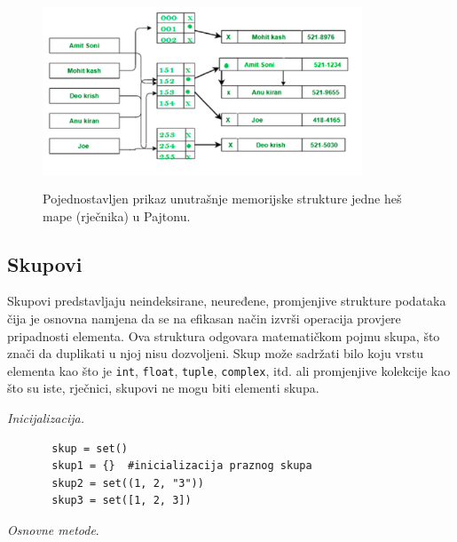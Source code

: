 	
	\begin{figure}
		\centering
		\includegraphics[width=270pt,height=160pt]{slike/dict_mem_organization.png}
		\caption{Pojednostavljen prikaz unutrašnje memorijske strukture jedne heš mape (rječnika) u Pajtonu.\protect\footnotemark}		\label{fig: dict_mem_organization}
	\end{figure}
\subsection{Skupovi}

Skupovi  predstavljaju neindeksirane, neuređene, promjenjive strukture podataka čija je osnovna namjena da se na efikasan način izvrši operacija provjere pripadnosti elementa. Ova struktura odgovara matematičkom pojmu skupa, što znači da duplikati u njoj nisu dozvoljeni. Skup može sadržati bilo koju vrstu elementa kao što je \texttt{int}, \texttt{float}, \texttt{tuple}, \texttt{complex}, itd. ali promjenjive kolekcije kao što su iste, rječnici, skupovi ne mogu biti elementi skupa. 


\textit{Inicijalizacija. }
\begin{verbatim}
	   skup = set()
	   skup1 = {}  #inicializacija praznog skupa
	   skup2 = set((1, 2, "3"))
	   skup3 = set([1, 2, 3])
\end{verbatim}

\textit{Osnovne metode}. 

